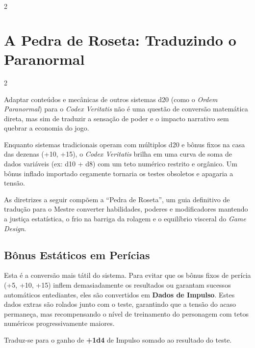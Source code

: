 \documentclass[a4paper,11pt,openany]{book}
\begin{document}
\begin{multicols}{2}
\end{multicols}


\chapter{A Pedra de Roseta: Traduzindo o Paranormal}

\begin{multicols}{2}

Adaptar conteúdos e mecânicas de outros sistemas d20 (como o \textit{Ordem Paranormal}) para o \textit{Codex Veritatis} não é uma questão de conversão matemática direta, mas sim de traduzir a sensação de poder e o impacto narrativo sem quebrar a economia do jogo.

Enquanto sistemas tradicionais operam com múltiplos d20 e bônus fixos na casa das dezenas (+10, +15), o \textit{Codex Veritatis} brilha em uma curva de soma de dados variáveis (ex: d10 + d8) com um teto numérico restrito e orgânico. Um bônus inflado importado cegamente tornaria os testes obsoletos e apagaria a tensão.

As diretrizes a seguir compõem a ``Pedra de Roseta'', um guia definitivo de tradução para o Mestre converter habilidades, poderes e modificadores mantendo a justiça estatística, o frio na barriga da rolagem e o equilíbrio visceral do \textit{Game Design}.

\section{Bônus Estáticos em Perícias}

Esta é a conversão mais tátil do sistema. Para evitar que os bônus fixos de perícia (+5, +10, +15) inflem demasiadamente os resultados ou garantam sucessos automáticos entediantes, eles são convertidos em \textbf{Dados de Impulso}. Estes dados extras são rolados junto com o teste, garantindo que a tensão do acaso permaneça, mas recompensando o nível de treinamento do personagem com tetos numéricos progressivamente maiores.

\begin{description}[font=\sffamily\bfseries\color{CodexRed}]

    
    \item[Bônus de +5:] Traduz-se para o ganho de \textbf{+1d4} de Impulso somado ao resultado do teste.
    

\end{description}
\end{multicols}
\end{document}
